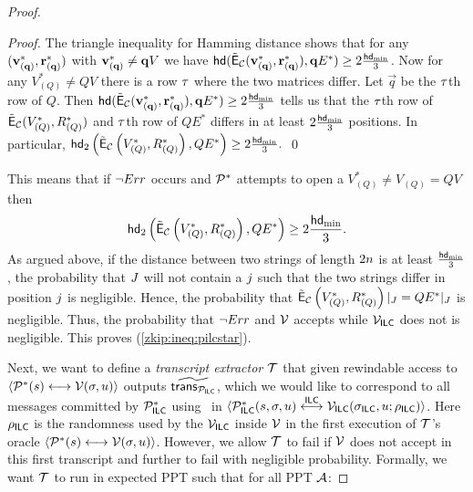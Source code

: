 \begin{proof}
\begin{proof}
The triangle inequality for Hamming distance shows that for any $({\mathbf{v}}_{(\mathbf{q})}^*,\mathbf{r}_{(\mathbf{q})}^*)$ with ${\mathbf{v}}_{(\mathbf{q})}^*\neq \mathbf{q} V$ we have $\mathsf{hd}(\tilde{\mathsf{E}}_{\mathcal{C}}({\mathbf{v}}_{(\mathbf{q})}^*,\mathbf{r}_{(\mathbf{q})}^*),\mathbf{q} E^*)\geq 2\frac{\mathsf{hd}_{\mathrm{min}}}{3}$. Now for any $V_{(Q)}^*\neq QV$ there is a row $\tau$ where the two matrices differ. Let $\vec{q}$ be the $\tau$th row of $Q$. Then $\mathsf{hd}(\tilde{\mathsf{E}}_{\mathcal{C}}({\mathbf{v}}_{(\mathbf{q})}^*,\mathbf{r}_{(\mathbf{q})}^*),\mathbf{q} E^*)\geq 2\frac{\mathsf{hd}_{\mathrm{min}}}{3}$ tells us that the $\tau$th row of $\tilde{\mathsf{E}}_{\mathcal{C}}(V_{(Q)}^*,R_{(Q)}^*)$ and $\tau$th row of $QE^*$ differs in at least $2\frac{\mathsf{hd}_{\mathrm{min}}}{3}$ positions. In particular, $ \mathsf{hd}_2\left(\tilde{\mathsf{E}}_{\mathcal{C}}\left(V_{(Q)}^*,R_{(Q)}^*\right),QE^*\right)\geq 2\frac{\mathsf{hd}_{\mathrm{min}}}{3}.$ \qed
\end{proof}

This means that if $\neg Err$ occurs and $\mathcal{P}^*$ attempts to open a $V_{(Q)}^*\neq V_{(Q)}=QV$ then 
\[ \mathsf{hd}_2\left(\tilde{\mathsf{E}}_{\mathcal{C}}\left(V_{(Q)}^*,R_{(Q)}^*\right), QE^*\right)\geq 2\frac{\mathsf{hd}_{\mathrm{min}}}{3}.\]
As argued above, if the distance between two strings of length $2n$ is at least $\frac{\mathsf{hd}_{\mathrm{min}}}{3}$, the probability that $J$ will not contain a $j$ such that the two strings differ in position $j$ is negligible. Hence, the probability that $\tilde{\mathsf{E}}_{\mathcal{C}}\left(V_{(Q)}^*,R_{(Q)}^*\right)|_J= QE^*|_J$ is negligible. Thus, the probability that $\neg Err$ and $\mathcal{V}$ accepts while $\mathcal{V}_{\mathsf{ILC}}$ does not is negligible. This proves (\ref{zkip:ineq:pilcstar}).

Next, we want to define a \emph{transcript extractor} $\mathcal{T}$ that given rewindable access to ${\langle \mathcal{P}^*(s)\longleftrightarrow\mathcal{V}(\mathsf{\sigma},u)\rangle}$ outputs $\widetilde{\mathsf{trans}_{\mathcal{P}_{\mathsf{ILC}}}}$, which we would like to correspond to all messages committed by $\mathcal{P}_{\mathsf{ILC}}^*$ using \ILCcommit\ in $ \langle \mathcal{P}_{\mathsf{ILC}}^*(s,\mathsf{\sigma},u)\overset{\mathsf{ILC}}{\longleftrightarrow}\mathcal{V}_{\mathsf{ILC}}(\mathsf{\sigma}_{\mathsf{ILC}},u;\rho_{\mathsf{ILC}})\rangle $. Here $\rho_{\mathsf{ILC}}$ is the randomness used by the $\mathcal{V}_{\mathsf{ILC}}$ inside $\mathcal{V}$ in the first execution of $\mathcal{T}$'s oracle ${\langle \mathcal{P}^*(s)\longleftrightarrow\mathcal{V}(\mathsf{\sigma},u)\rangle}$. However, we allow $\mathcal{T}$ to fail if $\mathcal{V}$ does not accept in this first transcript and further to fail with negligible probability. Formally, we want $\mathcal{T}$ to run in expected PPT such that for all PPT $\mathcal{A}$: 


\end{proof}
